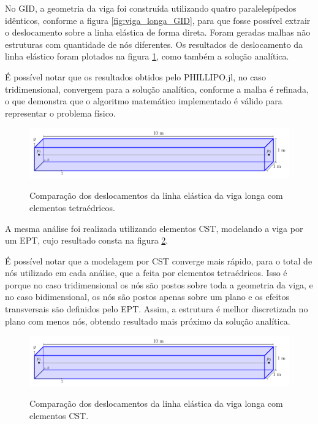 No GID, a geometria da viga foi construída utilizando quatro paralelepípedos idênticos, conforme a figura \ref{fig:viga_longa_GID}, para que fosse possível extrair o deslocamento sobre a linha elástica de forma direta. Foram geradas malhas não estruturas com quantidade de nós diferentes. Os resultados de deslocamento da linha elástico foram plotados na figura \ref{fig:viga_longa_grafico_tetra}, como também a solução analítica.

É possível notar que os resultados obtidos pelo PHILLIPO.jl, no caso tridimensional, convergem para a solução analítica, conforme a malha é refinada, o que demonstra que o algoritmo matemático implementado é válido para representar o problema físico.

\begin{figure}
    \centering  
    \caption{Comparação dos deslocamentos da linha elástica da viga longa com elementos tetraédricos.}
    \includegraphics[page=3, width=\textwidth]{Figuras/viga_longa.pdf}
    \label{fig:viga_longa_grafico_tetra}
\end{figure}

A mesma análise foi realizada utilizando elementos CST, modelando a viga por um EPT, cujo resultado consta na figura \ref{fig:viga_longa_grafico_CST}. 

É possível notar que a modelagem por CST converge mais rápido, para o total de nós utilizado em cada análise, que a feita por elementos tetraédricos. Isso é porque no caso tridimensional os nós são postos sobre toda a geometria da viga, e no caso bidimensional, os nós são postos apenas sobre um plano e os efeitos transversais são definidos pelo EPT. Assim, a estrutura é melhor discretizada no plano com menos nós, obtendo resultado mais próximo da solução analítica.

\begin{figure}
    \centering  
    \caption{Comparação dos deslocamentos da linha elástica da viga longa com elementos CST.}
    \includegraphics[page=5, width=\textwidth]{Figuras/viga_longa.pdf}
    \label{fig:viga_longa_grafico_CST}
\end{figure}